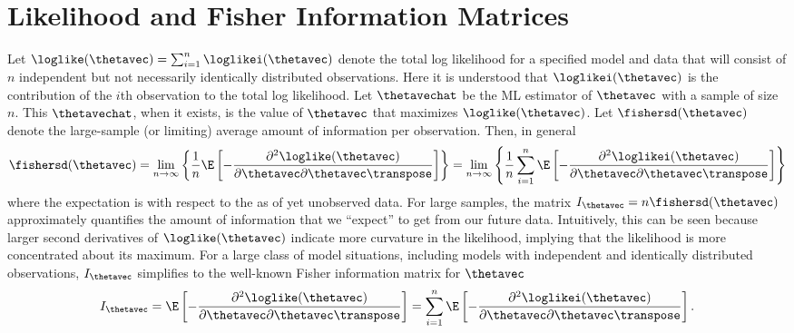 
\section{Likelihood and Fisher Information Matrices}
\label{asection:likelihood.information.matrix}

Let $\loglike(\thetavec)=\sum_{i=1}^{n}\loglikei(\thetavec)$ denote
the total log likelihood for a specified model and data that will
consist of $n$ independent but not necessarily identically distributed
observations.
Here it is understood that $\loglikei(\thetavec)$ is the
contribution of the $i$th observation to the total log likelihood.
Let $\thetavechat$ be the ML estimator of $\thetavec$
with a sample of size $n$.  
This $\thetavechat$, when it exists, is the value of
$\thetavec$ that maximizes $\loglike(\thetavec)$.
Let $\fishersd(\thetavec)$ denote the
large-sample (or limiting) average amount
of information per observation. Then, in
general
\begin{equation} 
\label{equation:general.information}
     \fishersd(\thetavec)= \lim_{n \rightarrow \infty}
     \left \{ \frac{1}{n}
     \E \left [
    -\frac{\partial ^2 \loglike(\thetavec)}{\partial \thetavec
      \partial \thetavec \transpose}\right ]
     \right \}=
\lim_{n \rightarrow \infty}
\left \{ \frac{1}{n}
\sum^{n}_{i=1} \E\left [-\frac{\partial ^2
\loglikei(\thetavec)}{\partial \thetavec
\partial \thetavec \transpose}\right ]
\right \}
\end{equation}
where the expectation is with respect to the
as of yet unobserved data. 
For large samples, the matrix $I_{\thetavec}=n\fishersd(\thetavec)$
approximately quantifies the amount of
information that we ``expect'' to get from our future data.
Intuitively, this can be seen because larger second derivatives of
$\loglike(\thetavec)$ indicate more curvature in the likelihood, implying that
the likelihood is more concentrated about its maximum.
For a large class of model situations, including
models with independent and identically distributed observations,
$I_{\thetavec}$  simplifies to the 
well-known Fisher information matrix for $\thetavec$
\begin{equation}
\label{equation:special.information}
     I_{\thetavec}= 
     \E \left [
    -\frac{\partial ^2 \loglike(\thetavec)}{\partial \thetavec
      \partial \thetavec \transpose}\right ]
      =
\sum^{n}_{i=1} \E\left [-\frac{\partial ^2
\loglikei(\thetavec)}{\partial \thetavec
\partial \thetavec \transpose}\right ].
\end{equation}
